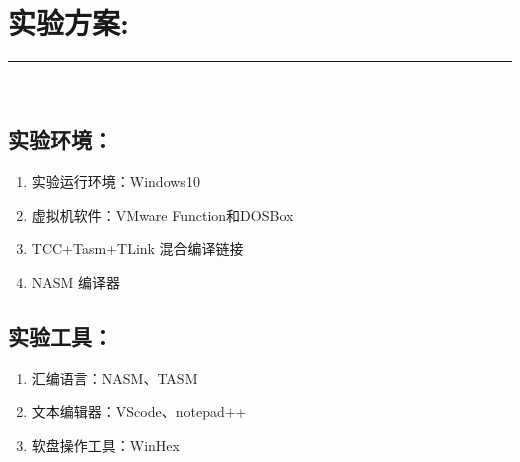 \documentclass[UTF8]{article}
\begin{document}
\section{实验方案:}
\noindent\rule[0.2\baselineskip]{\textwidth}{0.5pt}\\[-32pt]

\subsection{实验环境：}
\begin{enumerate}[1)]%
\heiti
\setlength{\itemsep}{0em}
	\item 实验运行环境：Windows10
	\item 虚拟机软件：VMware Function和DOSBox
	\item TCC+Tasm+TLink 混合编译链接
	\item NASM 编译器
	\end{enumerate}
\subsection{实验工具：}
\begin{enumerate}[1)]%
\heiti\setlength{\itemsep}{0em}
	\item 汇编语言：NASM、TASM
	\item 文本编辑器：VScode、notepad++
	\item 软盘操作工具：WinHex
\end{enumerate}
\end{document}
